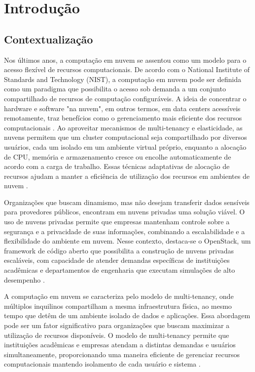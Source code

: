 \chapter*[Introdução]{Introdução}


\section{Contextualização}

Nos últimos anos, a computação em nuvem se assentou como um modelo para o acesso flexível de recursos computacionais. De acordo com o National Institute of Standards and Technology (NIST), a computação em nuvem pode ser definida como um paradigma que possibilita o acesso sob demanda a um conjunto compartilhado de recursos de computação configuráveis. A ideia de concentrar o hardware e software "na nuvem", em outros termos, em data centers acessíveis remotamente, traz benefícios como o gerenciamento mais eficiente dos recursos computacionais \cite{mell2011}. Ao aproveitar mecanismos de multi-tenancy e elasticidade, as nuvens permitem que um cluster computacional seja compartilhado por diversos usuários, cada um isolado em um ambiente virtual próprio, enquanto a alocação de CPU, memória e armazenamento cresce ou encolhe automaticamente de acordo com a carga de trabalho. Essas técnicas adaptativas de alocação de recursos ajudam a manter a eficiência de utilização dos recursos em ambientes de nuvem \cite{dai2015, ray2013}. 

Organizações que buscam dinamismo, mas não desejam transferir dados sensíveis para provedores públicos, encontram em nuvens privadas uma solução viável. O uso de nuvens privadas permite que empresas mantenham controle sobre a segurança e a privacidade de suas informações, combinando a escalabilidade e a flexibilidade do ambiente em nuvem. Nesse contexto, destaca-se o OpenStack, um framework de código aberto que possibilita a construção de nuvens privadas escaláveis, com capacidade de atender demandas específicas de instituições acadêmicas e departamentos de engenharia que executam simulações de alto desempenho \cite{heuchert2021}. 

A computação em nuvem se caracteriza pelo modelo de multi-tenancy, onde múltiplos inquilinos compartilham a mesma infraestrutura física, ao mesmo tempo que detêm de um ambiente isolado de dados e aplicações. Essa abordagem pode ser um fator significativo para organizações que buscam maximizar a utilização de recursos disponíveis. O modelo de multi-tenancy permite que instituições acadêmicas e empresas atendam a distintas demandas e usuários simultaneamente, proporcionando uma maneira eficiente de gerenciar recursos computacionais mantendo isolamento de cada usuário e sistema \cite{heuchert2021}.

